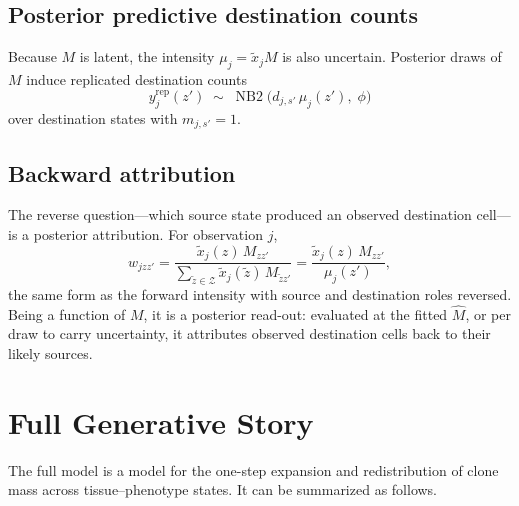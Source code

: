 \documentclass[11pt]{article}
\newcommand{\Zsp}{\mathcal{Z}}                    %
\theoremstyle{definition}
\begin{document}
\subsection{Posterior predictive destination counts}

Because $M$ is latent, the intensity $\mu_j = \tilde{x}_j M$ is also uncertain.
Posterior draws of $M$ induce replicated destination counts
\[
  y_j^{\mathrm{rep}}(z') \;\sim\; \operatorname{NB2}\!\bigl( d_{j,s'}\, \mu_j(z'),\; \phi \bigr)
\]
over destination states with $m_{j,s'} = 1$.

\subsection{Backward attribution}
\label{sec:backward}

The reverse question---which source state produced an observed destination
cell---is a posterior attribution. For observation $j$,
\[
  w_{jzz'}
  =
  \frac{\tilde{x}_j(z)\, M_{zz'}}
       {\sum_{\tilde z\in\Zsp} \tilde{x}_j(\tilde z)\, M_{\tilde z z'}}
  =
  \frac{\tilde{x}_j(z)\, M_{zz'}}{\mu_j(z')} ,
\]
the same form as the forward intensity with source and destination roles
reversed. Being a function of $M$, it is a posterior read-out: evaluated at the
fitted $\widehat{M}$, or per draw to carry uncertainty, it attributes observed
destination cells back to their likely sources.

\section{Full Generative Story}
\label{sec:generative}

The full model is a model for the one-step expansion and redistribution of clone
mass across tissue--phenotype states. It can be summarized as follows.
\end{document}
